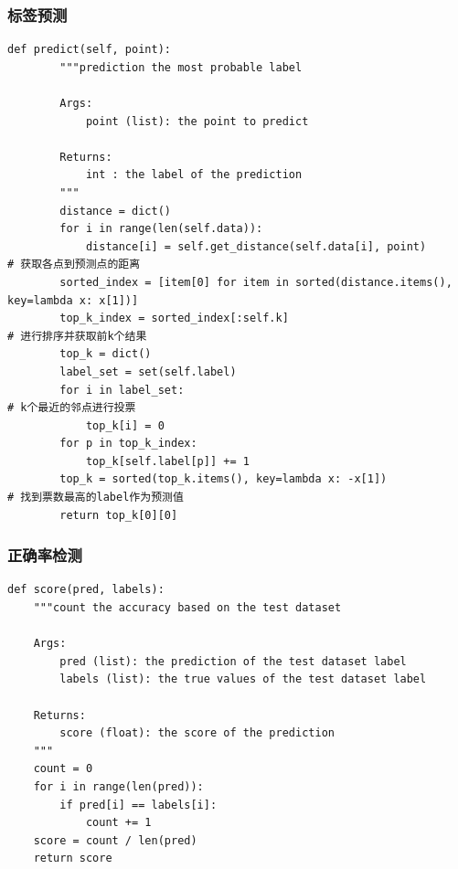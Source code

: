 \documentclass[utf-8]{article}
\begin{document}
\subsubsection{标签预测}
\begin{lstlisting}[style = python]
	def predict(self, point):
        """prediction the most probable label

        Args:
            point (list): the point to predict

        Returns:
            int : the label of the prediction
        """
        distance = dict()
        for i in range(len(self.data)):
            distance[i] = self.get_distance(self.data[i], point)			# 获取各点到预测点的距离
        sorted_index = [item[0] for item in sorted(distance.items(), key=lambda x: x[1])]	
        top_k_index = sorted_index[:self.k]									# 进行排序并获取前k个结果
        top_k = dict()
        label_set = set(self.label)
        for i in label_set:													# k个最近的邻点进行投票
            top_k[i] = 0
        for p in top_k_index:
            top_k[self.label[p]] += 1 
        top_k = sorted(top_k.items(), key=lambda x: -x[1])					# 找到票数最高的label作为预测值
        return top_k[0][0]
\end{lstlisting}

\subsubsection{正确率检测}
\begin{lstlisting}[style = python]
	def score(pred, labels):
    """count the accuracy based on the test dataset

    Args:
        pred (list): the prediction of the test dataset label
        labels (list): the true values of the test dataset label

    Returns:
        score (float): the score of the prediction
    """
    count = 0
    for i in range(len(pred)):
        if pred[i] == labels[i]:
            count += 1
    score = count / len(pred)
    return score
\end{lstlisting}
\end{document}
